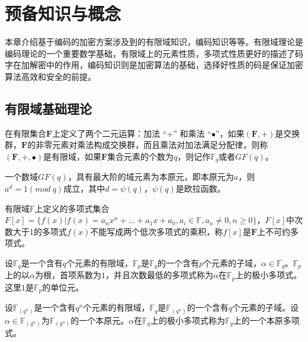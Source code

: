 \chapter{预备知识与概念}
\label{chap1}
本章介绍基于编码的加密方案涉及到的有限域知识，编码知识等等。有限域理论是编码理论的一个重要数学基础，有限域上的元素性质，多项式性质更好的描述了码字在加解密中的作用，编码知识则是加密算法的基础，选择好性质的码是保证加密算法高效和安全的前提。

\section{有限域基础理论}
\begin{define}[有限域]
	在有限集合$\mathbf{F}$上定义了两个二元运算：加法 “$+$” 和乘法 “$\bullet$”，如果$(\mathbf{F}, +)$是交换群，$\mathbf{F}$的非零元素对乘法构成交换群，而且乘法对加法满足分配律，则称$(\mathbf{F}, +, \bullet)$是有限域，如果$\mathbf{F}$集合元素的个数为$q$，则记作$\mathbb{F}_q$或者$GF(q)$。
\end{define}

\begin{define}[本原元]
	一个数域$GF(q)$，具有最大阶的域元素为本原元，即本原元为$a$，则$a^d=1(mod~ q)$成立，其中$d=\psi(q)$，$\psi(q)$是欧拉函数。
\end{define}

\begin{define}[不可约多项式]
	有限域$\mathbb{F}$上定义的多项式集合$F[x]=\{f(x)|f(x)=a_nx^n + ... + a_1x + a_0,a_i \in \mathbb{F}, a_n \neq 0, n \geq 0\}$，$F[x]$中次数大于1的多项式$f(x)$不能写成两个低次多项式的乘积，称$f[x]$是$\mathbf{F}$上不可约多项式。
\end{define}

\begin{define}[极小多项式]
	设$\mathbb{F}_q$是一个含有$q$个元素的有限域，$\mathbb{F}_p$是$\mathbb{F}_q$的一个含有$p$个元素的子域，$\alpha \in \mathbb{F}_q$。$\mathbb{F}_p$上的以$\alpha$为根，首项系数为$1$，并且次数最低的多项式称为$\alpha$在$\mathbb{F}_p$上的极小多项式。这里$1$是$\mathbb{F}_p$的单位元。
\end{define}

\begin{define}[本原多项式]
	设$\mathbb{F}_(q^n)$是一个含有$q^n$个元素的有限域，$\mathbb{F}_q$是$\mathbb{F}_(q^n)$的一个含有$q$个元素的子域。设$\alpha \in \mathbb{F}_(q^n)$为$\mathbb{F}_(q^n)$的一个本原元。$\alpha$在$\mathbb{F}_q$上的极小多项式称为$\mathbb{F}_q$上的一个本原多项式。
\end{define}

